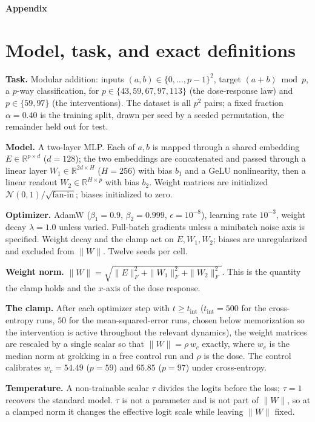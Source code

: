 \appendix
\bigskip
\begin{center}\large\textbf{Appendix}\end{center}

\section{Model, task, and exact definitions}

\textbf{Task.} Modular addition: inputs $(a,b)\in\{0,\dots,p-1\}^2$, target $(a+b)\bmod p$, a $p$-way
classification, for $p\in\{43,59,67,97,113\}$ (the dose-response law) and $p\in\{59,97\}$ (the
interventions). The dataset is all $p^2$ pairs; a fixed fraction $\alpha=0.40$ is the training split,
drawn per seed by a seeded permutation, the remainder held out for test.

\textbf{Model.} A two-layer MLP. Each of $a,b$ is mapped through a shared embedding
$E\in\mathbb{R}^{p\times d}$ ($d=128$); the two embeddings are concatenated and passed through a linear
layer $W_1\in\mathbb{R}^{2d\times H}$ ($H=256$) with bias $b_1$ and a GeLU nonlinearity, then a linear
readout $W_2\in\mathbb{R}^{H\times p}$ with bias $b_2$. Weight matrices are initialized
$\mathcal{N}(0,1)/\sqrt{\mathrm{fan\text{-}in}}$; biases initialized to zero.

\textbf{Optimizer.} AdamW ($\beta_1=0.9$, $\beta_2=0.999$, $\epsilon=10^{-8}$), learning rate $10^{-3}$,
weight decay $\lambda=1.0$ unless varied. Full-batch gradients unless a minibatch noise axis is specified.
Weight decay and the clamp act on $E,W_1,W_2$; biases are unregularized and excluded from $\|W\|$.
Twelve seeds per cell.

\textbf{Weight norm.} $\|W\|=\sqrt{\|E\|_F^2+\|W_1\|_F^2+\|W_2\|_F^2}$. This is the quantity the clamp
holds and the $x$-axis of the dose response.

\textbf{The clamp.} After each optimizer step with $t\ge t_{\mathrm{int}}$ ($t_{\mathrm{int}}=500$ for the
cross-entropy runs, $50$ for the mean-squared-error runs, chosen below memorization so the intervention
is active throughout the relevant dynamics), the weight matrices are rescaled by a single scalar so that
$\|W\|=\rho\,w_c$ exactly, where $w_c$ is the median norm at grokking in a free control run and $\rho$ is
the dose. The control calibrates $w_c=54.49$ ($p=59$) and $65.85$ ($p=97$) under cross-entropy.

\textbf{Temperature.} A non-trainable scalar $\tau$ divides the logits before the loss; $\tau=1$ recovers
the standard model. $\tau$ is not a parameter and is not part of $\|W\|$, so at a clamped norm it changes
the effective logit scale while leaving $\|W\|$ fixed.

